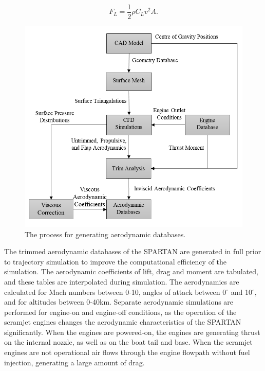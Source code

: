 \begin{equation}
F_L = \frac{1}{2}\rho C_L v^2 A .
\end{equation}


\begin{figure}[ht]
	\centering
	\includegraphics[width=0.7\linewidth]{figures/3_vehicle_design/FlowChart}
	\caption{The process for generating aerodynamic databases.}
	\label{fig:FlowChart}
\end{figure}

The trimmed aerodynamic databases of the SPARTAN are generated in full prior to trajectory simulation to improve the computational efficiency of the simulation. The aerodynamic coefficients of lift, drag and moment are tabulated, and these tables are interpolated during simulation. 
The aerodynamics are calculated for Mach numbers between 0-10, angles of attack between 0$^\circ$ and 10$^\circ$, and for altitudes between 0-40km. Separate aerodynamic simulations are performed for engine-on and engine-off conditions, as the operation of the scramjet engines changes the aerodynamic characteristics of the SPARTAN significantly. When the engines are powered-on, the engines are generating thrust on the internal nozzle, as well as on the boat tail and base.  When the scramjet engines are not operational air flows through the engine flowpath without fuel injection, generating a large amount of drag. 


